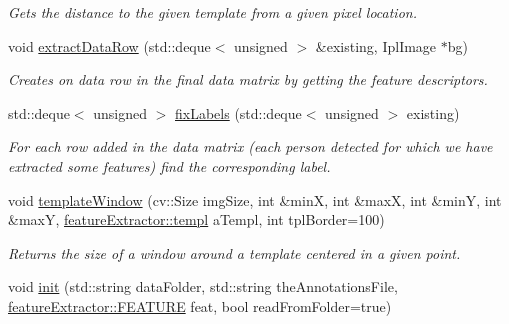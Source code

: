 \begin{DoxyCompactItemize}
\begin{DoxyCompactList}\small\item\em Gets the distance to the given template from a given pixel location. \item\end{DoxyCompactList}\item 
\hypertarget{classpeopleDetector_a5ea8d8459fd4f5197ca3d64fe210e532}{
void \hyperlink{classpeopleDetector_a5ea8d8459fd4f5197ca3d64fe210e532}{extractDataRow} (std::deque$<$ unsigned $>$ \&existing, IplImage $\ast$bg)}
\label{classpeopleDetector_a5ea8d8459fd4f5197ca3d64fe210e532}

\begin{DoxyCompactList}\small\item\em Creates on data row in the final data matrix by getting the feature descriptors. \item\end{DoxyCompactList}\item 
\hypertarget{classpeopleDetector_ab2ab40efaa0b85c48fd9cba0538d8ed8}{
std::deque$<$ unsigned $>$ \hyperlink{classpeopleDetector_ab2ab40efaa0b85c48fd9cba0538d8ed8}{fixLabels} (std::deque$<$ unsigned $>$ existing)}
\label{classpeopleDetector_ab2ab40efaa0b85c48fd9cba0538d8ed8}

\begin{DoxyCompactList}\small\item\em For each row added in the data matrix (each person detected for which we have extracted some features) find the corresponding label. \item\end{DoxyCompactList}\item 
\hypertarget{classpeopleDetector_a20af398a23594735d7d8263f48235c2d}{
void \hyperlink{classpeopleDetector_a20af398a23594735d7d8263f48235c2d}{templateWindow} (cv::Size imgSize, int \&minX, int \&maxX, int \&minY, int \&maxY, \hyperlink{structfeatureExtractor_1_1templ}{featureExtractor::templ} aTempl, int tplBorder=100)}
\label{classpeopleDetector_a20af398a23594735d7d8263f48235c2d}

\begin{DoxyCompactList}\small\item\em Returns the size of a window around a template centered in a given point. \item\end{DoxyCompactList}\item 
\hypertarget{classpeopleDetector_ac4d3919aca10802b6964dac668fcc6ed}{
void \hyperlink{classpeopleDetector_ac4d3919aca10802b6964dac668fcc6ed}{init} (std::string dataFolder, std::string theAnnotationsFile, \hyperlink{classfeatureExtractor_a84a8847c4124b284d1d5ae20bc9be583}{featureExtractor::FEATURE} feat, bool readFromFolder=true)}
\label{classpeopleDetector_ac4d3919aca10802b6964dac668fcc6ed}


\end{DoxyCompactItemize}
